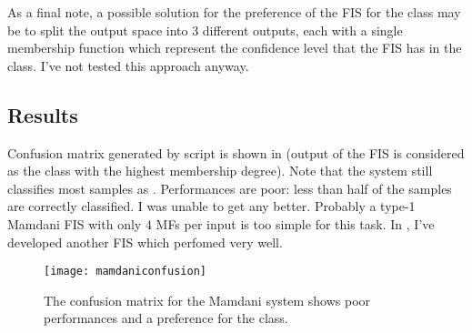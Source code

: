 As a final note, a possible solution for the preference of the FIS for the
 class may be to split the output space into 3 different outputs,
each with a single membership function which represent the confidence level
that the FIS has in the class. I've not tested this approach anyway.

\subsection{Results}

Confusion matrix generated by script  is shown in
 (output of the FIS is considered as the class
with the highest membership degree). Note that the system still classifies most
samples as . Performances are poor: less than half of the samples
are correctly classified. I was unable to get any better. Probably a type-1
Mamdani FIS with only 4 MFs per input is too simple for this task. In
, I've developed another FIS which perfomed very well.

\begin{figure}[htbp]
	\centering
	\texttt{[image: mamdaniconfusion]}
	\caption{The confusion matrix for the Mamdani system shows poor
	performances and a preference for the 
	class.}\label{fig:mamdaniconfusion}
\end{figure}
